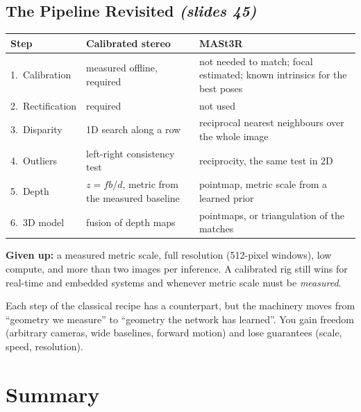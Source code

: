 \documentclass[11pt,a4paper]{article}
\newcommand{\slr}[1]{\texorpdfstring{\emph{(slides #1)}}{(slides #1)}}
\theoremstyle{definition}
\theoremstyle{plain}
\theoremstyle{remark}
\begin{document}
\subsection{The Pipeline Revisited \slr{45}}
\begin{center}\small
\renewcommand{\arraystretch}{1.2}
\begin{tabular}{@{}p{2.3cm}p{5.2cm}p{6.6cm}@{}}\toprule
\textbf{Step} & \textbf{Calibrated stereo} & \textbf{MASt3R}\\\midrule
1.\ Calibration & measured offline, required & not needed to match; focal estimated; known intrinsics for the best poses\\
2.\ Rectification & required & not used\\
3.\ Disparity & 1D search along a row & reciprocal nearest neighbours over the whole image\\
4.\ Outliers & left-right consistency test & reciprocity, the same test in 2D\\
5.\ Depth & $z=fb/d$, metric from the measured baseline & pointmap, metric scale from a learned prior\\
6.\ 3D model & fusion of depth maps & pointmaps, or triangulation of the matches\\\bottomrule
\end{tabular}
\end{center}
\textbf{Given up:} a measured metric scale, full resolution (512-pixel windows), low compute, and more than two images per inference.
A calibrated rig still wins for real-time and embedded systems and whenever metric scale must be \emph{measured}.
\begin{intuition}
Each step of the classical recipe has a counterpart, but the machinery moves from ``geometry we measure'' to ``geometry the network has learned''. You gain freedom (arbitrary cameras, wide baselines, forward motion) and lose guarantees (scale, speed, resolution).
\end{intuition}


\section*{Summary}
\end{document}
